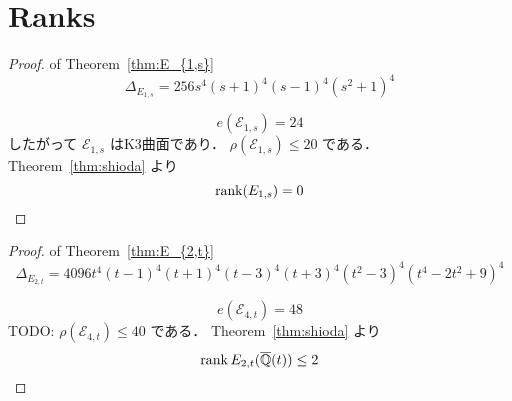 \documentclass[main]{subfiles}
\begin{document}
\chapter{Ranks}

\begin{proof}{of Theorem~\ref{thm:E_{1,s}}}
    \begin{equation}
        \Delta_{E_{1,s}} = 256s^{4} (s + 1)^{4} (s - 1)^{4} (s^{2} + 1)^{4}
    \end{equation}

    \begin{equation}
        e(\mathcal{E}_{1,s}) = 24
    \end{equation}
    したがって $\mathcal{E}_{1,s}$ はK3曲面であり． $\rho(\mathcal{E}_{1,s}) \leq 20$ である．
    Theorem~\ref{thm:shioda} より
    \begin{equation}
        \operatorname{rank}(E_{1,s}) = 0
    \end{equation}
\end{proof}

\begin{proof}{of Theorem~\ref{thm:E_{2,t}}}
    \begin{equation}
        \Delta_{E_{2,t}} = 4096t^{4}(t - 1)^{4}(t + 1)^{4}(t - 3)^{4}(t + 3)^{4}(t^{2} - 3)^{4}(t^{4} - 2t^{2} + 9)^{4}
    \end{equation}

    \begin{equation}
        e(\mathcal{E}_{4,t}) = 48
    \end{equation}
    TODO: $\rho(\mathcal{E}_{4,t}) \leq 40$ である．
    Theorem~\ref{thm:shioda} より
    \begin{equation}
        \operatorname{rank} E_{2,t}(\overline{\mathbb{Q}}(t)) \leq 2
    \end{equation}
\end{proof}
\end{document}
